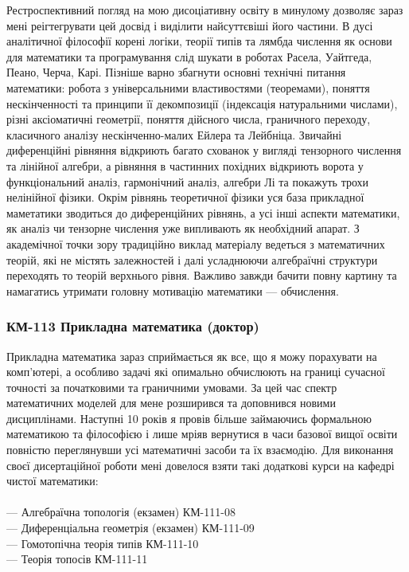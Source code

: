Рестроспективний погляд на мою дисоціативну освіту в минулому
дозволяє зараз мені реігтегрувати цей досвід і виділити найсуттєвіші
його частини. В дусі аналітичної філософії корені логіки, теорії типів
та лямбда числення як основи для математики та програмування слід шукати
в роботах Расела, Уайтгеда, Пеано, Черча, Карі. Пізніше варно збагнути
основні технічні питання математики: робота з універсальними
властивостями (теоремами), поняття нескінченності та принципи
її декомпозиції (індексація натуральними числами), різні аксіоматичні
геометрії, поняття дійсного числа, граничного переходу, класичного
аналізу нескінченно-малих Ейлера та Лейбніца. Звичайні диференційні
рівняння відкриють багато схованок у вигляді тензорного числення та
лінійної алгебри, а рівняння в частинних похідних відкриють ворота
у функціональний аналіз, гармонічний аналіз, алгебри Лі та покажуть
трохи нелінійної фізики. Окрім рівнянь теоретичної фізики уся база
прикладної маметатики зводиться до диференційних рівнянь, а усі інші
аспекти математики, як аналіз чи тензорне числення уже випливають як
необхідний апарат. З академічної точки зору традиційно виклад матеріалу
ведеться з математичних теорій, які не містять залежностей і далі
усладнюючи алгебраїчні структури переходять то теорій верхнього рівня.
Важливо завжди бачити повну картину та намагатись утримати головну
мотивацію математики --- обчислення.

\subsubsection*{КМ-113 Прикладна математика (доктор)}

Прикладна математика зараз сприймається як все, що я можу порахувати
на комп'ютері, а особливо задачі які опимально обчислюють на границі
сучасної точності за початковими та граничними умовами. За цей час
спектр математичних моделей для мене розширився та доповнився новими
дисциплінами. Наступні 10 років я провів більше займаючись формальною
математикою та філософією і лише мріяв вернутися в часи базової вищої
освіти повністю переглянувши усі математичні засоби та їх взаємодію.
Для виконання своєї дисертаційної роботи мені довелося взяти такі
додаткові курси на кафедрі чистої математики:
\\
\\
\noindent--- Алгебраїчна топологія (екзамен) КМ-111-08\\
--- Диференціальна геометрія (екзамен) КМ-111-09\\
--- Гомотопічна теорія типів КМ-111-10\\
--- Теорія топосів КМ-111-11\\

